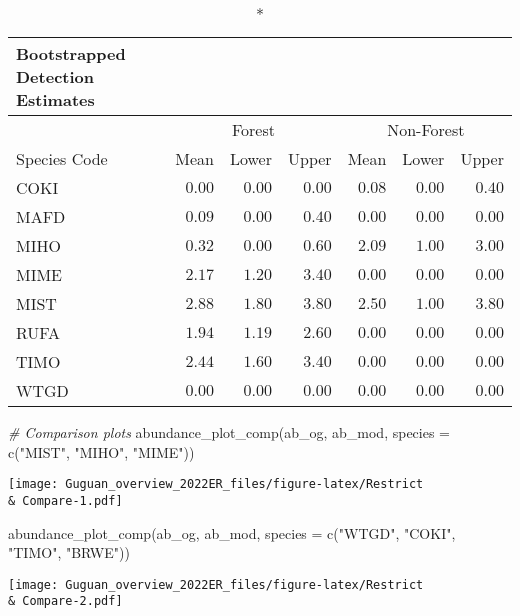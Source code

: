 \documentclass[
]{article}
\newenvironment{Shaded}{\begin{snugshade}}{\end{snugshade}}
\newcommand{\AttributeTok}[1]{\textcolor[rgb]{0.77,0.63,0.00}{#1}}
\newcommand{\CommentTok}[1]{\textcolor[rgb]{0.56,0.35,0.01}{\textit{#1}}}
\newcommand{\FunctionTok}[1]{\textcolor[rgb]{0.00,0.00,0.00}{#1}}
\newcommand{\NormalTok}[1]{#1}
\newcommand{\StringTok}[1]{\textcolor[rgb]{0.31,0.60,0.02}{#1}}
\begin{document}
\begin{longtable}{lrrrrrr}
\caption*{
{\large Bootstrapped Detection Estimates}
} \\ 
\toprule
 & \multicolumn{3}{c}{Forest} & \multicolumn{3}{c}{Non-Forest} \\ 
\cmidrule(lr){2-4} \cmidrule(lr){5-7}
Species Code & Mean & Lower & Upper & Mean & Lower & Upper \\ 
\midrule
COKI & $0.00$ & $0.00$ & $0.00$ & $0.08$ & $0.00$ & $0.40$ \\ 
MAFD & $0.09$ & $0.00$ & $0.40$ & $0.00$ & $0.00$ & $0.00$ \\ 
MIHO & $0.32$ & $0.00$ & $0.60$ & $2.09$ & $1.00$ & $3.00$ \\ 
MIME & $2.17$ & $1.20$ & $3.40$ & $0.00$ & $0.00$ & $0.00$ \\ 
MIST & $2.88$ & $1.80$ & $3.80$ & $2.50$ & $1.00$ & $3.80$ \\ 
RUFA & $1.94$ & $1.19$ & $2.60$ & $0.00$ & $0.00$ & $0.00$ \\ 
TIMO & $2.44$ & $1.60$ & $3.40$ & $0.00$ & $0.00$ & $0.00$ \\ 
WTGD & $0.00$ & $0.00$ & $0.00$ & $0.00$ & $0.00$ & $0.00$ \\ 
\bottomrule
\end{longtable}

\begin{Shaded}
\begin{Highlighting}[]
\CommentTok{\# Comparison plots}
\FunctionTok{abundance\_plot\_comp}\NormalTok{(ab\_og, ab\_mod, }\AttributeTok{species =} \FunctionTok{c}\NormalTok{(}\StringTok{"MIST"}\NormalTok{, }\StringTok{"MIHO"}\NormalTok{, }\StringTok{"MIME"}\NormalTok{))}
\end{Highlighting}
\end{Shaded}

\texttt{[image: Guguan\_overview\_2022ER\_files/figure-latex/Restrict \\\& Compare-1.pdf]}

\begin{Shaded}
\begin{Highlighting}[]
\FunctionTok{abundance\_plot\_comp}\NormalTok{(ab\_og, ab\_mod, }\AttributeTok{species =} \FunctionTok{c}\NormalTok{(}\StringTok{"WTGD"}\NormalTok{, }\StringTok{"COKI"}\NormalTok{, }\StringTok{"TIMO"}\NormalTok{, }\StringTok{"BRWE"}\NormalTok{))}
\end{Highlighting}
\end{Shaded}

\texttt{[image: Guguan\_overview\_2022ER\_files/figure-latex/Restrict \\\& Compare-2.pdf]}
\end{document}
